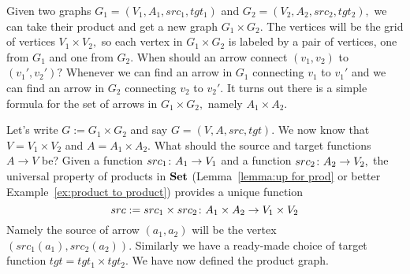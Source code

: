 \documentclass[CT4S-EN-RU]{subfiles}
\begin{document}
\begin{exampleENG}\label{ex:product of graphs}
Given two graphs $G_1=(V_1,A_1,src_1,tgt_1)$ and $G_2=(V_2,A_2,src_2,tgt_2),$ we can take their product and get a new graph $G_1\times G_2.$ The vertices will be the grid of vertices $V_1\times V_2,$ so each vertex in $G_1\times G_2$ is labeled by a pair of vertices, one from $G_1$ and one from $G_2.$ When should an arrow connect $(v_1,v_2)$ to $(v_1',v_2')?$ Whenever we can find an arrow in $G_1$ connecting $v_1$ to $v_1'$ and we can find an arrow in $G_2$ connecting $v_2$ to $v_2'.$ It turns out there is a simple formula for the set of arrows in $G_1\times G_2,$ namely $A_1\times A_2.$

Let's write $G:=G_1\times G_2$ and say $G=(V,A,src,tgt).$ We now know that $V=V_1\times V_2$ and $A=A_1\times A_2.$ What should the source and target functions $A\to V$ be? Given a function $src_1\colon A_1\rightarrow V_1$ and a function $src_2\colon A_2\rightarrow V_2,$ the universal property of products in ${\mathbf{Set}}$ (Lemma~\ref{lemma:up for prod} or better Example~\ref{ex:product to product}) provides a unique function 
$$src:=src_1\times src_2\colon A_1\times A_2\rightarrow V_1\times V_2$$ 
Namely the source of arrow $(a_1,a_2)$ will be the vertex $(src_1(a_1),src_2(a_2)).$ Similarly we have a ready-made choice of target function $tgt=tgt_1\times tgt_2.$ We have now defined the product graph.


\end{exampleENG}
\end{document}
